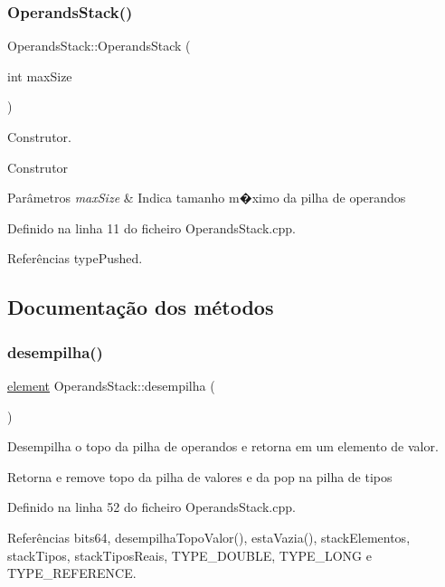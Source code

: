 \subsubsection{\texorpdfstring{Operands\+Stack()}{OperandsStack()}}
{\footnotesize\ttfamily Operands\+Stack\+::\+Operands\+Stack (\begin{DoxyParamCaption}\item[{int}]{max\+Size }\end{DoxyParamCaption})}



Construtor. 

Construtor


\begin{DoxyParams}{Parâmetros}
{\em max\+Size} & Indica tamanho m�ximo da pilha de operandos \\
\hline
\end{DoxyParams}


Definido na linha 11 do ficheiro Operands\+Stack.\+cpp.



Referências type\+Pushed.



\subsection{Documentação dos métodos}
\mbox{\label{classOperandsStack_a3213a1b633149de9332217d403ee84b6}} 
\subsubsection{\texorpdfstring{desempilha()}{desempilha()}}
{\footnotesize\ttfamily \hyperlink{unionelement}{element} Operands\+Stack\+::desempilha (\begin{DoxyParamCaption}{ }\end{DoxyParamCaption})}



Desempilha o topo da pilha de operandos e retorna em um elemento de valor. 

Retorna e remove topo da pilha de valores e da pop na pilha de tipos 

Definido na linha 52 do ficheiro Operands\+Stack.\+cpp.



Referências bits64, desempilha\+Topo\+Valor(), esta\+Vazia(), stack\+Elementos, stack\+Tipos, stack\+Tipos\+Reais, T\+Y\+P\+E\+\_\+\+D\+O\+U\+B\+LE, T\+Y\+P\+E\+\_\+\+L\+O\+NG e T\+Y\+P\+E\+\_\+\+R\+E\+F\+E\+R\+E\+N\+CE.



